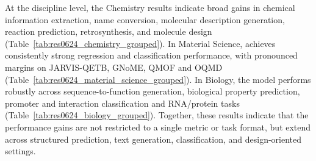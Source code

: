 \begin{appendices}
At the discipline level, the Chemistry results indicate broad gains in chemical information extraction, name conversion, molecular description generation, reaction prediction, retrosynthesis, and molecule design (Table~\ref{tab:res0624_chemistry_grouped}). In Material Science, \projName{} achieves consistently strong regression and classification performance, with pronounced margins on JARVIS-QETB, GNoME, QMOF and OQMD (Table~\ref{tab:res0624_material_science_grouped}). In Biology, the model performs robustly across sequence-to-function generation, biological property prediction, promoter and interaction classification and RNA/protein tasks (Table~\ref{tab:res0624_biology_grouped}). Together, these results indicate that the performance gains are not restricted to a single metric or task format, but extend across structured prediction, text generation, classification, and design-oriented settings.


\end{appendices}
